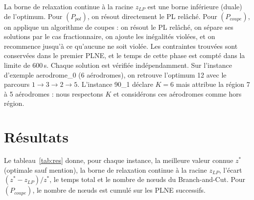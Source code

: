 \documentclass[11pt]{article}
\begin{document}
La borne de relaxation continue à la racine $z_{LP}$ est une borne inférieure (duale) de
l'optimum. Pour $(P_{pol})$, on résout directement le PL relâché. Pour $(P_{coupe})$, on
applique un algorithme de coupes : on résout le PL relâché, on sépare ses solutions par
le cas fractionnaire, on ajoute les inégalités violées, et on recommence jusqu'à ce
qu'aucune ne soit violée. Les contraintes
trouvées sont conservées dans le premier PLNE, et le temps de cette phase est compté dans
la limite de 600\,s. Chaque solution est vérifiée indépendamment. Sur
l'instance d'exemple aerodrome\_0 (6 aérodromes), on retrouve l'optimum 12 avec le parcours
$1\to3\to2\to5$. L'instance 90\_1 déclare $K=6$ mais attribue la région 7 à 5
aérodromes : nous respectons $K$ et considérons ces aérodromes comme hors région.

\section{Résultats}

Le tableau~\ref{tab:res} donne, pour chaque instance, la meilleure valeur connue $z^*$
(optimale sauf mention), la borne de relaxation continue à la racine $z_{LP}$, l'écart
$(z^*-z_{LP})/z^*$, le temps total et le nombre de nœuds du Branch-and-Cut. Pour
$(P_{coupe})$, le nombre de nœuds est cumulé sur les PLNE successifs.
\end{document}
